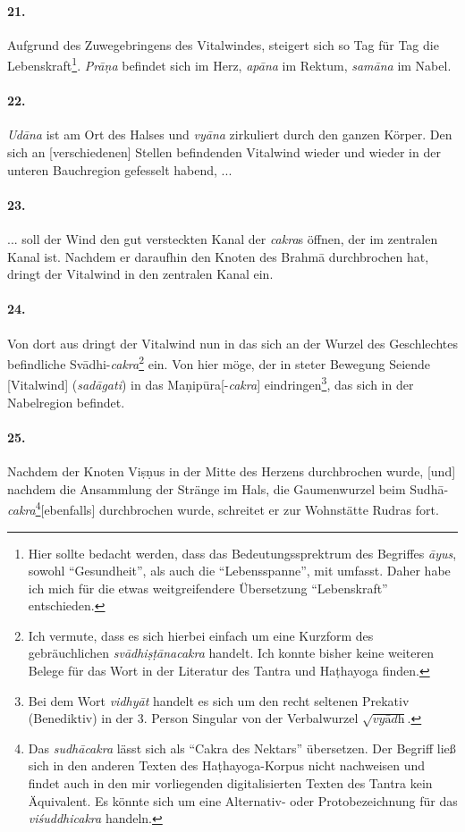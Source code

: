 \documentclass[a4paper,12pt]{article}
\begin{document}
\paragraph{21.} Aufgrund des Zuwegebringens des Vitalwindes, steigert sich so Tag für Tag die Lebenskraft\footnote{Hier sollte bedacht werden, dass das Bedeutungssprektrum des Begriffes \textit{āyus}, sowohl ``Gesundheit'', als auch die ``Lebensspanne'', mit umfasst. Daher habe ich mich für die etwas weitgreifendere Übersetzung ``Lebenskraft'' entschieden.}. \textit{Prāṇa} befindet sich im Herz, \textit{apāna} im Rektum, \textit{samāna} im Nabel. 

\paragraph{22.} \textit{Udāna} ist am Ort des Halses und \textit{vyāna} zirkuliert durch den ganzen Körper. Den sich an [verschiedenen] Stellen befindenden Vitalwind wieder und wieder in der unteren Bauchregion gefesselt habend, ...

\paragraph{23.} ... soll der Wind den gut versteckten Kanal der \textit{cakra}s öffnen, der im zentralen Kanal ist. Nachdem er daraufhin den Knoten des Brahmā durchbrochen hat, dringt der Vitalwind in den zentralen Kanal ein.

\paragraph{24.} Von dort aus dringt der Vitalwind nun in das sich an der Wurzel des Geschlechtes befindliche Svādhi-\textit{cakra}\footnote{Ich vermute, dass es sich hierbei einfach um eine Kurzform des gebräuchlichen \textit{svādhiṣṭānacakra} handelt. Ich konnte bisher keine weiteren Belege für das Wort in der Literatur des Tantra und Haṭhayoga finden.} ein. Von hier möge, der in steter Bewegung Seiende [Vitalwind] (\textit{sadāgati}) in das Maṇipūra[-\textit{cakra}] eindringen\footnote{Bei dem Wort \textit{vidhyāt} handelt es sich um den recht seltenen Prekativ (Benediktiv) in der 3. Person Singular von der Verbalwurzel $\sqrt{\textit{vyādh}}$.}, das sich in der Nabelregion befindet.

\paragraph{25.} Nachdem der Knoten Viṣṇus in der Mitte des Herzens durchbrochen wurde, [und] nachdem die Ansammlung der Stränge im Hals, die Gaumenwurzel beim Sudhā-\textit{cakra}\footnote{Das \textit{sudhācakra} lässt sich als ``Cakra des Nektars'' übersetzen. Der Begriff ließ sich in den anderen Texten des Haṭhayoga-Korpus nicht nachweisen und findet auch in den mir vorliegenden digitalisierten Texten des Tantra kein Äquivalent. Es könnte sich um eine Alternativ- oder Protobezeichnung für das \textit{viśuddhicakra} handeln.}[ebenfalls] durchbrochen wurde, schreitet er zur Wohnstätte Rudras fort. 
\end{document}
